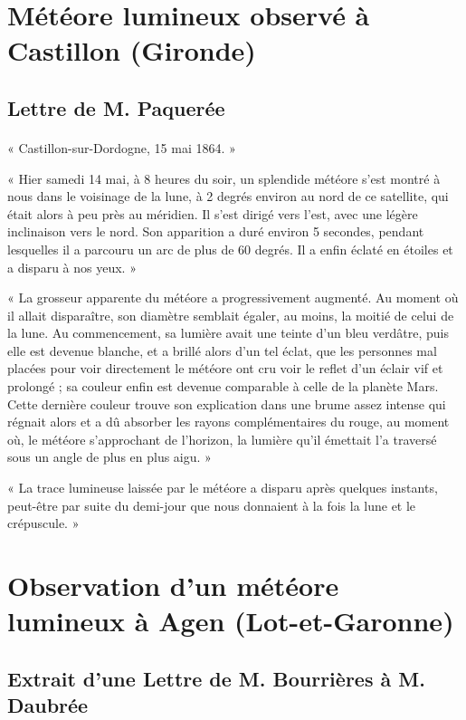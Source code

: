 \documentclass[a4paper, 11pt, oneside, polutonikogreek, french]{article}
\begin{document}
\paragraph{}
\section{Météore lumineux observé à Castillon (Gironde)}
\subsection*{Lettre de M. Paquerée}
\paragraph{}
« Castillon-sur-Dordogne, 15 mai 1864. »

« Hier samedi 14 mai, à 8 heures du soir, un splendide météore s'est montré à nous dans le voisinage de la lune, à 2 degrés environ au nord de ce satellite, qui était alors à peu près au méridien. Il s'est dirigé vers l'est, avec une légère inclinaison vers le nord. Son apparition a duré environ 5 secondes, pendant lesquelles il a parcouru un arc de plus de 60 degrés. Il a enfin éclaté en étoiles et a disparu à nos yeux. »

« La grosseur apparente du météore a progressivement augmenté. Au moment où il allait disparaître, son diamètre semblait égaler, au moins, la moitié de celui de la lune. Au commencement, sa lumière avait une teinte d'un bleu verdâtre, puis elle est devenue blanche, et a brillé alors d'un tel éclat, que les personnes mal placées pour voir directement le météore ont cru voir le reflet d'un éclair vif et prolongé ; sa couleur enfin est devenue comparable à celle de la planète Mars. Cette dernière couleur trouve son explication dans une brume assez intense qui régnait alors et a dû absorber les rayons complémentaires du rouge, au moment où, le météore s'approchant de l'horizon, la lumière qu'il émettait l'a traversé sous un angle de plus en plus aigu. »

« La trace lumineuse laissée par le météore a disparu après quelques instants, peut-être par suite du demi-jour que nous donnaient à la fois la lune et le crépuscule. »
\clearpage
\section{Observation d'un météore lumineux à Agen (Lot-et-Garonne)}
\subsection*{Extrait d'une Lettre de M. Bourrières à M. Daubrée}
\end{document}
